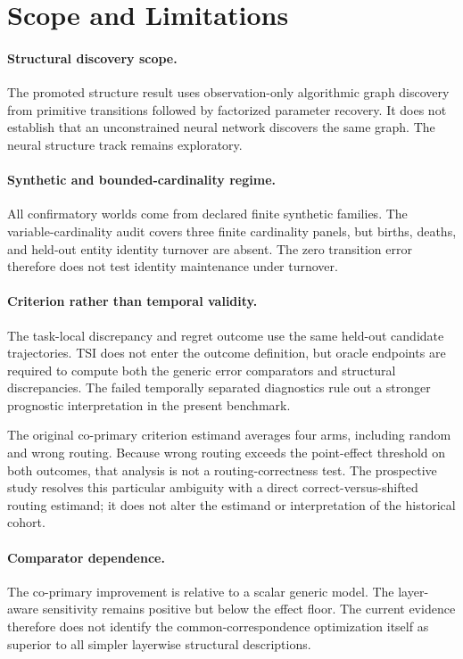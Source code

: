 \section{Scope and Limitations}
\label{sec:limitations}

\paragraph{Structural discovery scope.}
The promoted structure result uses observation-only algorithmic graph discovery
from primitive transitions followed by factorized parameter recovery.  It does
not establish that an unconstrained neural network discovers the same graph.
The neural structure track remains exploratory.

\paragraph{Synthetic and bounded-cardinality regime.}
All confirmatory worlds come from declared finite synthetic families.  The
variable-cardinality audit covers three finite cardinality panels, but births,
deaths, and held-out entity identity turnover are absent.  The zero transition
error therefore does not test identity maintenance under turnover.

\paragraph{Criterion rather than temporal validity.}
The task-local discrepancy and regret outcome use the same held-out candidate
trajectories.  TSI does not enter the outcome definition, but oracle endpoints
are required to compute both the generic error comparators and structural
discrepancies.  The failed temporally separated diagnostics rule out a stronger
prognostic interpretation in the present benchmark.

The original co-primary criterion estimand averages four arms, including random
and wrong routing.  Because wrong routing exceeds the point-effect threshold on
both outcomes, that analysis is not a routing-correctness test.  The prospective
study resolves this particular ambiguity with a direct correct-versus-shifted
routing estimand; it does not alter the estimand or interpretation of the
historical cohort.

\paragraph{Comparator dependence.}
The co-primary improvement is relative to a scalar generic model.  The
layer-aware sensitivity remains positive but below the effect floor.  The
current evidence therefore does not identify the common-correspondence
optimization itself as superior to all simpler layerwise structural
descriptions.

